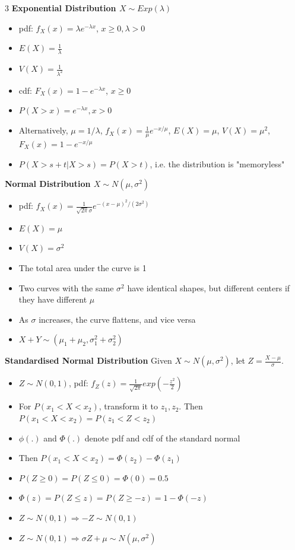 \documentclass[10pt, landscape]{article}
\begin{document}
\begin{multicols*}{3}
\textbf{Exponential Distribution $X \sim Exp(\lambda)$}
\begin{itemize}
    \item pdf: $f_X(x)=\lambda e^{-\lambda x}$, $x \geq 0, \lambda > 0$
    \item $E(X)=\frac{1}{\lambda}$
    \item $V(X)=\frac{1}{\lambda^2}$
    \item cdf: $F_X(x)=1-e^{-\lambda x}$, $x \geq 0$
    \item $P(X>x)=e^{-\lambda x}, x > 0$
    \item Alternatively, $\mu=1/\lambda$, $f_X(x)=\frac{1}{\mu}e^{-x/\mu}$, $E(X)=\mu$, $V(X)=\mu^2$, $F_X(x)=1-e^{-x/\mu}$
    \item $P(X>s+t|X>s)=P(X>t)$, i.e. the distribution is "memoryless"
\end{itemize}

\textbf{Normal Distribution $X\sim N(\mu, \sigma^2)$}
\begin{itemize}
    \item pdf: $f_X(x)=\frac{1}{\sqrt{2\pi}\sigma}e^{-(x-\mu)^2/(2\sigma^2)}$
    \item $E(X)=\mu$
    \item $V(X)=\sigma^2$
    \item The total area under the curve is 1
    \item Two curves with the same $\sigma^2$ have identical shapes, but different centers if they have different $\mu$
    \item As $\sigma$ increases, the curve flattens, and vice versa
    \item $X+Y \sim (\mu_1+\mu_2, \sigma_1^2 + \sigma^2_2)$
\end{itemize}

\textbf{Standardised Normal Distribution} Given $X\sim N(\mu, \sigma^2)$, let $Z=\frac{X-\mu}{\sigma}$.
\begin{itemize}
    \item  $Z \sim N(0, 1)$, pdf: $f_Z(z)=\frac{1}{\sqrt{2\pi}}exp(-\frac{z^2}{2})$
    \item For $P(x_1<X<x_2)$, transform it to $z_1, z_2$. Then $P(x_1<X<x_2)=P(z_1<Z<z_2)$
    \item $\phi(.)$ and $\Phi(.)$ denote pdf and cdf of the standard normal
    \item Then $P(x_1<X<x_2)=\Phi(z_2)-\Phi(z_1)$
    \item $P(Z \geq 0) = P(Z\leq 0)=\Phi(0)=0.5$
    \item $\Phi(z)=P(Z \leq z)=P(Z \geq -z)=1-\Phi(-z)$
    \item $Z\sim N(0, 1) \Rightarrow -Z \sim N(0, 1)$
    \item $Z \sim N(0, 1) \Rightarrow \sigma Z + \mu \sim N(\mu, \sigma^2)$
\end{itemize}


\end{multicols*}
\end{document}
